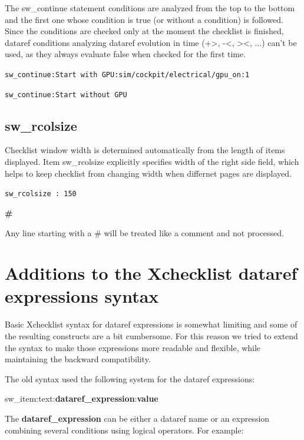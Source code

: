 \documentclass[11pt,parskip=half,a4paper]{scrartcl}
\newcommand\textstyleSourceText[1]{\texttt{#1}}
\begin{document}
The sw\_continue statement conditions are analyzed from the top to the bottom and the first one whose condition is true (or without a condition) is followed. Since the conditions are checked only at the moment the checklist is finished, dataref conditions analyzing dataref evolution in time ({\textquotedbl}+{\textgreater}{\textquotedbl},
{\textquotedbl}-{\textless}{\textquotedbl}, {\textquotedbl}{\textgreater}{\textless}{\textquotedbl}, ...) can't be used, as they always evaluate false when checked for the first time.

{\ttfamily
\textstyleSourceText{sw\_continue:Start with GPU:sim/cockpit/electrical/gpu\_on:1}}

{\ttfamily
\textstyleSourceText{sw\_continue:Start without GPU}}

\subsection{sw\_rcolsize}
Checklist window width is determined automatically from the length of items displayed. Item sw\_rcolsize explicitly specifies width of the right side field, which helps to keep checklist from changing width when differnet pages are displayed.

\textstyleSourceText{sw\_rcolsize : 150}

{\bfseries
\#}

Any line starting with a \# will be treated like a comment and not processed. \newline


\newpage
\section{Additions to the Xchecklist dataref expressions syntax}

Basic Xchecklist syntax for dataref expressions is somewhat limiting and some of the resulting constructs are a bit cumbersome. For this reason we tried to extend the syntax to make those expressions more readable and flexible, while maintaining the backward compatibility.

The old syntax used the following system for the dataref expressions: \

sw\_item:text:\textbf{dataref\_expression}:\textbf{value}  \

The \textbf{dataref\_expression} can be either a dataref name or an expression combining several conditions using logical operators.
For example: \\
\end{document}
